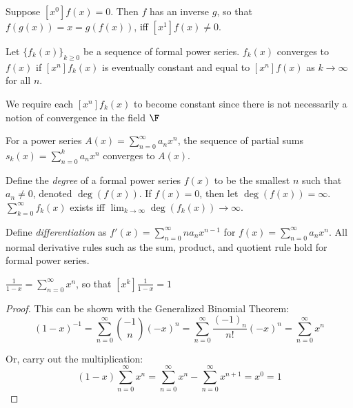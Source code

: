 \documentclass[a4paper]{article}
\begin{document}
\begin{proposition}
Suppose $[x^0]f(x)=0$. Then $f$ has an inverse $g$, so that $f(g(x))=x=g(f(x))$, iff $[x^1]f(x)\neq0$.
\end{proposition}

\begin{definition}
Let $\{f_k(x)\}_{k\geq0}$ be a sequence of formal power series. $f_k(x)$ converges to $f(x)$ if $[x^n]f_k(x)$ is eventually constant and equal to $[x^n]f(x)$ as $k\rightarrow\infty$ for all $n$.
\begin{arrows}
\item We require each $[x^n]f_k(x)$ to become constant since there is not necessarily a notion of convergence in the field $\F$
\end{arrows}
\end{definition}

\begin{example}
For a power series $A(x)=\sum_{n=0}^\infty a_nx^n$, the sequence of partial sums $s_k(x)=\sum_{n=0}^ka_nx^n$ converges to $A(x)$.
\end{example}

\begin{proposition}
Define the \emph{degree} of a formal power series $f(x)$ to be the smallest $n$ such that $a_n\neq0$, denoted $\deg(f(x))$. If $f(x)=0$, then let $\deg(f(x))=\infty$. $\sum_{k=0}^\infty f_k(x)$ exists iff $\lim_{k\rightarrow\infty}\deg(f_k(x))\rightarrow\infty$.
\end{proposition}

\begin{proposition}
Define \emph{differentiation} as $f'(x)=\sum_{n=0}^\infty na_nx^{n-1}$ for $f(x)=\sum_{n=0}^\infty a_nx^n$. All normal derivative rules such as the sum, product, and quotient rule hold for formal power series.
\end{proposition}

\begin{example}\label{recip_1_minus_x}
$\displaystyle\frac1{1-x}=\sum_{n=0}^\infty x^n$, so that $\displaystyle[x^k]\frac1{1-x}=1$

\begin{hl}
\begin{proof}
This can be shown with the Generalized Binomial Theorem:
\begin{equation*}
(1-x)^{-1}=\sum_{n=0}^\infty\binom{-1}n(-x)^n=\sum_{n=0}^\infty\frac{(-1)_n}{n!}(-x)^n=\sum_{n=0}^\infty x^n
\end{equation*}

Or, carry out the multiplication:
\begin{equation*}
(1-x)\sum_{n=0}^\infty x^n=\sum_{n=0}^\infty x^n-\sum_{n=0}^\infty x^{n+1}=x^0=1
\end{equation*}
\end{proof}
\end{hl}
\end{example}
\end{document}
